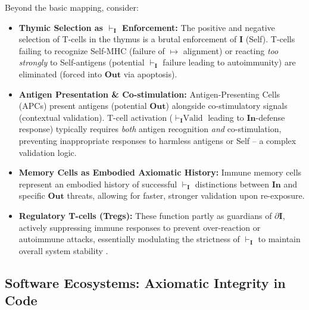 \documentclass{article}
\newcommand{\Isness}{\mathbf{I}}            %
\newcommand{\Inness}{\mathbf{In}}           %
\newcommand{\Outness}{\mathbf{Out}}         %
\newcommand{\enactment}{\ensuremath{\mapsto}} %
\newcommand{\validates}[1]{\ensuremath{\vdash_{#1}}} %
\newcommand{\boundary}[1]{\ensuremath{\partial #1}} %
\begin{document}
Beyond the basic mapping, consider:
\begin{itemize}
    \item \textbf{Thymic Selection as $\validates{\Isness}$ Enforcement:} The positive and negative selection of T-cells in the thymus is a brutal enforcement of $\Isness$ (Self). T-cells failing to recognize Self-MHC (failure of $\enactment$ alignment) or reacting \textit{too strongly} to Self-antigens (potential $\validates{\Isness}$ failure leading to autoimmunity) are eliminated (forced into $\Outness$ via apoptosis).
    \item \textbf{Antigen Presentation \& Co-stimulation:} Antigen-Presenting Cells (APCs) present antigens (potential $\Outness$) alongside co-stimulatory signals (contextual validation). T-cell activation ($\validates{\Isness} \text{Valid}$ leading to $\Inness$-defense response) typically requires \textit{both} antigen recognition \textit{and} co-stimulation, preventing inappropriate responses to harmless antigens or Self – a complex validation logic.
    \item \textbf{Memory Cells as Embodied Axiomatic History:} Immune memory cells represent an embodied history of successful $\validates{\Isness}$ distinctions between $\Inness$ and specific $\Outness$ threats, allowing for faster, stronger validation upon re-exposure.
    \item \textbf{Regulatory T-cells (Tregs):} These function partly as guardians of $\boundary{\Isness}$, actively suppressing immune responses to prevent over-reaction or autoimmune attacks, essentially modulating the strictness of $\validates{\Isness}$ to maintain overall system stability \citep{Bateson1972}.
\end{itemize}

\subsection{Software Ecosystems: Axiomatic Integrity in Code}
\end{document}
